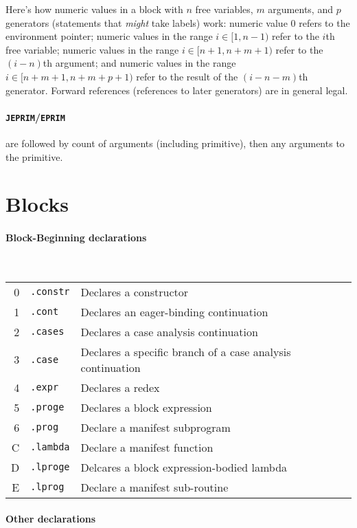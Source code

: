 \documentclass{article}
\begin{document}
Here's how numeric values in a block with $n$ free variables, $m$ arguments, and $p$ generators
(statements that \emph{might} take labels) work:
numeric value $0$ refers to the environment pointer;
numeric values in the range $i \in [1, n - 1)$ refer to the $i$th free variable;
numeric values in the range $i \in [n + 1, n + m + 1)$ refer to the $(i - n)$th argument; and
numeric values in the range $i \in [n + m + 1, n + m + p + 1)$ refer to the result of the $(i - n - m)$th generator.
Forward references (references to later generators) are in general legal.

\paragraph{\texttt{JEPRIM}/\texttt{EPRIM}} are followed by count of arguments (including primitive),
then any arguments to the primitive.

\section{Blocks}

\paragraph{Block-Beginning declarations}\

\begin{tabular}{rl@{ --- }l}
  0 & \texttt{.constr} & Declares a constructor \\
  1 & \texttt{.cont} & Declares an eager-binding continuation \\
  2 & \texttt{.cases} & Declares a case analysis continuation \\
  3 & \texttt{.case} & Declares a specific branch of a case analysis continuation \\
  4 & \texttt{.expr} & Declares a redex \\
  5 & \texttt{.proge} & Declares a block expression \\
  6 & \texttt{.prog} & Declare a manifest subprogram \\
  C & \texttt{.lambda} & Declare a manifest function \\
  D & \texttt{.lproge} & Delcares a block expression-bodied lambda \\
  E & \texttt{.lprog} & Declare a manifest sub-routine \\
\end{tabular}

\paragraph{Other declarations}\
\end{document}
